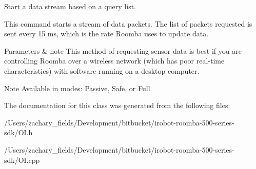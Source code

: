 Start a data stream based on a query list. 

This command starts a stream of data packets. The list of packets requested is sent every 15 ms, which is the rate Roomba uses to update data. 
\begin{DoxyParams}{Parameters}
{\em } & note This method of requesting sensor data is best if you are controlling Roomba over a wireless network (which has poor real-\/time characteristics) with software running on a desktop computer. \\
\hline
\end{DoxyParams}
\begin{DoxyNote}{Note}
Available in modes\+: Passive, Safe, or Full. 
\end{DoxyNote}


The documentation for this class was generated from the following files\+:\begin{DoxyCompactItemize}
\item 
/\+Users/zachary\+\_\+fields/\+Development/bitbucket/irobot-\/roomba-\/500-\/series-\/sdk/O\+I.\+h\item 
/\+Users/zachary\+\_\+fields/\+Development/bitbucket/irobot-\/roomba-\/500-\/series-\/sdk/O\+I.\+cpp\end{DoxyCompactItemize}
